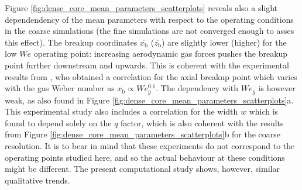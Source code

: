 Figure \ref{fig:dense_core_mean_parameters_scatterplots} reveals also a slight dependendency of the mean parameters with respect to the operating conditions in the coarse simulations (the fine simulations are not converged enough to asses this effect). The breakup coordinates $\overline{x_\mathrm{b}}$ ($\overline{z_\mathrm{b}}$) are slightly lower (higher) for the low $We$ operating point: increasing aerodynamic gas forces pushes the breakup point further downstream and upwards. This is coherent with the experimental results from , who obtained a correlation for the axial breakup point which varies with the gas Weber number as $x_\mathrm{b} \propto We_g^{0.1}$. The dependency with $We_g$ is however weak, as also found in Figure \ref{fig:dense_core_mean_parameters_scatterplots}a. This experimental study also includes a correlation for the width $w$ which is found to depend solely on the $q$ factor, which is also coherent with the results from Figure \ref{fig:dense_core_mean_parameters_scatterplots}b for the coarse resolution. It is to bear in mind that these experiments do not correspond to the operating points studied here, and so the actual behaviour at these conditions might be different. The present computational study shows, however, similar qualitative trends. 


